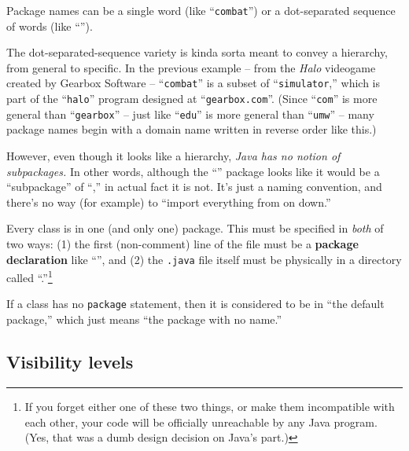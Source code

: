\begin{compactenum}

\item Package names can be a single word (like ``\texttt{combat}'') or a
dot-separated sequence of words (like
``'').

\item The dot-separated-sequence variety is kinda sorta meant to convey a
hierarchy, from general to specific. In the previous example -- from the
\textit{Halo} videogame created by Gearbox Software -- ``\texttt{combat}'' is a
subset of ``\texttt{simulator},'' which is part of the ``\texttt{halo}''
program designed at ``\texttt{gearbox.com}''. (Since ``\texttt{com}'' is more
general than ``\texttt{gearbox}'' -- just like ``\texttt{edu}'' is more general
than ``\texttt{umw}'' -- many package names begin with a domain name written in
reverse order like this.)

\item However, even though it looks like a hierarchy, \textit{Java has no
notion of subpackages.} In other words, although the
``'' package looks like it would be a
``subpackage'' of ``,'' in actual fact it is not. It's
just a naming convention, and there's no way (for example) to ``import
everything from  on down.''

\item Every class is in one (and only one) package. This must be specified in
\textit{both} of two ways: (1) the first (non-comment) line of the file must be
a \textbf{package declaration} like ``'', and (2) the \texttt{.java} file itself
must be physically in a directory called
``.''\footnote{If you forget either one
of these two things, or make them incompatible with each other, your code will
be officially unreachable by any Java program. (Yes, that was a dumb design
decision on Java's part.)}

\item If a class has no \texttt{package} statement, then it is considered to be
in ``the default package,'' which just means ``the package with no name.''
\end{compactenum}

\subsection{Visibility levels}


